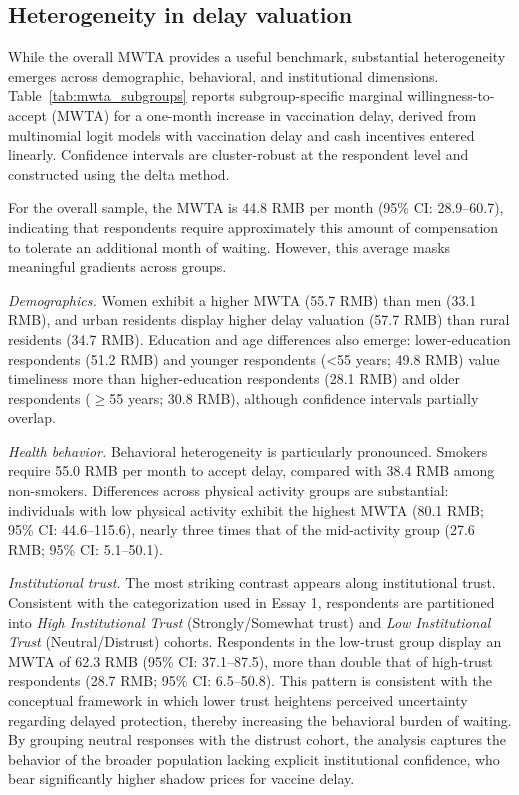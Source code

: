 \subsection{Heterogeneity in delay valuation} 
\label{subsec:essay2_heterogeneity} 

While the overall MWTA provides a useful benchmark, substantial heterogeneity emerges across demographic, behavioral, and institutional dimensions. Table~\ref{tab:mwta_subgroups} reports subgroup-specific marginal willingness-to-accept (MWTA) for a one-month increase in vaccination delay, derived from multinomial logit models with vaccination delay and cash incentives entered linearly. Confidence intervals are cluster-robust at the respondent level and constructed using the delta method. 

For the overall sample, the MWTA is 44.8 RMB per month (95\% CI: 28.9--60.7), indicating that respondents require approximately this amount of compensation to tolerate an additional month of waiting. However, this average masks meaningful gradients across groups. 

\textit{Demographics.} Women exhibit a higher MWTA (55.7 RMB) than men (33.1 RMB), and urban residents display higher delay valuation (57.7 RMB) than rural residents (34.7 RMB). Education and age differences also emerge: lower-education respondents (51.2 RMB) and younger respondents (<55 years; 49.8 RMB) value timeliness more than higher-education respondents (28.1 RMB) and older respondents ($\geq$55 years; 30.8 RMB), although confidence intervals partially overlap. 

\textit{Health behavior.} Behavioral heterogeneity is particularly pronounced. Smokers require 55.0 RMB per month to accept delay, compared with 38.4 RMB among non-smokers. Differences across physical activity groups are substantial: individuals with low physical activity exhibit the highest MWTA (80.1 RMB; 95\% CI: 44.6--115.6), nearly three times that of the mid-activity group (27.6 RMB; 95\% CI: 5.1--50.1). 

\textit{Institutional trust.} The most striking contrast appears along institutional trust. Consistent with the categorization used in Essay 1, respondents are partitioned into \textit{High Institutional Trust} (Strongly/Somewhat trust) and \textit{Low Institutional Trust} (Neutral/Distrust) cohorts. Respondents in the low-trust group display an MWTA of 62.3 RMB (95\% CI: 37.1--87.5), more than double that of high-trust respondents (28.7 RMB; 95\% CI: 6.5--50.8). This pattern is consistent with the conceptual framework in which lower trust heightens perceived uncertainty regarding delayed protection, thereby increasing the behavioral burden of waiting. By grouping neutral responses with the distrust cohort, the analysis captures the behavior of the broader population lacking explicit institutional confidence, who bear significantly higher shadow prices for vaccine delay.

